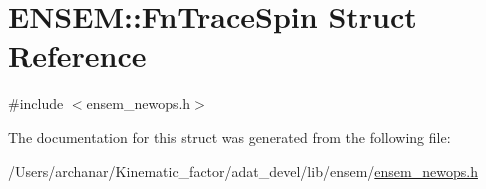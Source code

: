 \hypertarget{structENSEM_1_1FnTraceSpin}{}\section{E\+N\+S\+EM\+:\+:Fn\+Trace\+Spin Struct Reference}
\label{structENSEM_1_1FnTraceSpin}


{\ttfamily \#include $<$ensem\+\_\+newops.\+h$>$}



The documentation for this struct was generated from the following file\+:\begin{DoxyCompactItemize}
\item 
/\+Users/archanar/\+Kinematic\+\_\+factor/adat\+\_\+devel/lib/ensem/\mbox{\hyperlink{lib_2ensem_2ensem__newops_8h}{ensem\+\_\+newops.\+h}}\end{DoxyCompactItemize}
